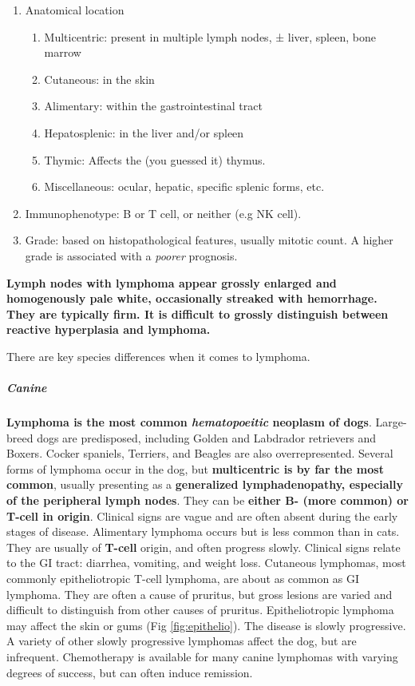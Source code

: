 \documentclass[openany]{article}
\providecommand{\tightlist}{%
  \setlength{\itemsep}{0pt}\setlength{\parskip}{0pt}}
\let\oldsubparagraph\subparagraph
\renewcommand{\subparagraph}[1]{\oldsubparagraph{#1}\mbox{}}
\begin{document}
\begin{enumerate}
\def\labelenumi{\arabic{enumi}.}
\tightlist
\item
  Anatomical location

  \begin{enumerate}
  \def\labelenumii{\roman{enumii})}
  \tightlist
  \item
    Multicentric: present in multiple lymph nodes, ± liver, spleen, bone
    marrow
  \item
    Cutaneous: in the skin
  \item
    Alimentary: within the gastrointestinal tract
  \item
    Hepatosplenic: in the liver and/or spleen
  \item
    Thymic: Affects the (you guessed it) thymus.
  \item
    Miscellaneous: ocular, hepatic, specific splenic forms, etc.
  \end{enumerate}
\item
  Immunophenotype: B or T cell, or neither (e.g NK cell).
\item
  Grade: based on histopathological features, usually mitotic count. A
  higher grade is associated with a \emph{poorer} prognosis.
\end{enumerate}

\textbf{Lymph nodes with lymphoma appear grossly enlarged and
homogenously pale white, occasionally streaked with hemorrhage. They are
typically firm. It is difficult to grossly distinguish between reactive
hyperplasia and lymphoma.}

There are key species differences when it comes to lymphoma.

\subparagraph{Canine}\label{canine}

\textbf{Lymphoma is the most common \emph{hematopoeitic} neoplasm of
dogs}. Large-breed dogs are predisposed, including Golden and Labdrador
retrievers and Boxers. Cocker spaniels, Terriers, and Beagles are also
overrepresented. Several forms of lymphoma occur in the dog, but
\textbf{multicentric is by far the most common}, usually presenting as a
\textbf{generalized lymphadenopathy, especially of the peripheral lymph
nodes}. They can be \textbf{either B- (more common) or T-cell in
origin}. Clinical signs are vague and are often absent during the early
stages of disease. Alimentary lymphoma occurs but is less common than in
cats. They are usually of \textbf{T-cell} origin, and often progress
slowly. Clinical signs relate to the GI tract: diarrhea, vomiting, and
weight loss. Cutaneous lymphomas, most commonly epitheliotropic T-cell
lymphoma, are about as common as GI lymphoma. They are often a cause of
pruritus, but gross lesions are varied and difficult to distinguish from
other causes of pruritus. Epitheliotropic lymphoma may affect the skin
or gums (Fig \ref{fig:epithelio}). The disease is slowly progressive. A
variety of other slowly progressive lymphomas affect the dog, but are
infrequent. Chemotherapy is available for many canine lymphomas with
varying degrees of success, but can often induce remission.
\end{document}
